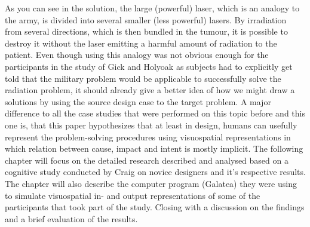 \documentclass[12pt]{article}
\begin{document}
\newpage
As you can see in the solution, the large (powerful) laser, which is an analogy to the army, is divided into several smaller (less powerful) lasers. By irradiation from several directions, which is then bundled in the tumour, it is possible to destroy it without the laser emitting a harmful amount of radiation to the patient. 
Even though using this analogy was not obvious enough for the participants in the study of Gick and Holyoak as subjects had to explicitly get told that the military problem would be applicable to successfully solve the radiation problem, it should already give a better idea of how we might draw a solutions by using the source design case to the target problem. A major difference to all the case studies that were performed on this topic before and this one is, that this paper hypothesizes that at least in design, humans can usefully represent the problem-solving procedures using visuospatial representations in which relation between cause, impact and intent is mostly implicit. The following chapter will focus on the detailed research described and analysed based on a cognitive study conducted by Craig \cite{craig2001perceptual} on novice designers and it's respective results. The chapter will also describe the computer program (Galatea) they were using to simulate visuospatial in- and output representations of some of the participants that took part of the study. Closing with a discussion on the findings and a brief evaluation of the results. 
\end{document}
